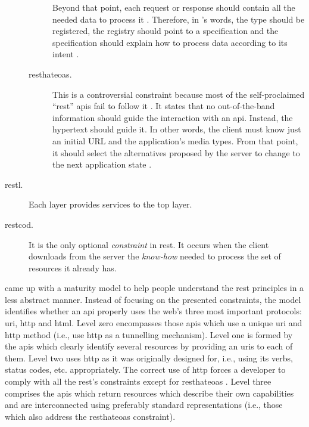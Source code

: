 \begin{description}
\begin{description}
	                        Beyond that point, each request or response should contain all the needed data to process it \citep{wahbe_self-descriptive_2010}.
	                        Therefore, in \citeauthor{fielding_seeking_2006}'s words,
	                        the type should be registered,
	                        the registry should point to a specification and 
	                        the specification should explain how to process data according to its intent \citep{fielding_seeking_2006}. %
	\item[\acf{resthateoas}.] This is a controversial constraint because most of the self-proclaimed ``\ac{rest}'' \acp{api} fail to follow it \citep{moore_hypermedia_2010,house_how_2012}.
	                           It states that no out-of-the-band information should guide the interaction with an \ac{api}.
	                           Instead, the hypertext should guide it.
	                           In other words, the client must know just an initial URL and the application's media types.
	                           From that point, it should select the alternatives proposed by the server to change to the next application state \citep{fielding_rest_2008}.
    \end{description}
 \item[\acf{restl}.] Each layer provides services to the top layer. %
 \item[\acf{restcod}.] It is the only optional \emph{constraint} in \ac{rest}.
		       It occurs when the client downloads from the server the \emph{know-how} needed to process the set of resources it already has.
\end{description}



\citet{richardson_introducing_2008} came up with a maturity model to help people understand the \ac{rest} principles in a less abstract manner.
Instead of focusing on the presented constraints, the model identifies whether an \ac{api} properly uses the web's three most important protocols: \ac{uri}, \ac{http} and \ac{html}.
Level zero encompasses those \acp{api} which use a unique \ac{uri} and \ac{http} method (i.e., use \ac{http} as a tunnelling mechanism).
Level one is formed by the \acp{api} which clearly identify several resources by providing an \acp{uri} to each of them.
Level two uses \ac{http} as it was originally designed for, i.e., using its verbs, status codes, etc. appropriately. 
The correct use of \ac{http} forces a developer to comply with all the \ac{rest}'s constraints except for \ac{resthateoas} \citep{moore_hypermedia_2010}.
Level three comprises the \acp{api} which return resources which describe their own capabilities and are interconnected using preferably standard representations (i.e., those which also address the \acf{resthateoas} constraint).


